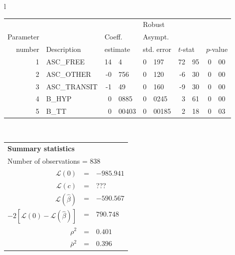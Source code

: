   \begin{tabular}{l}
\begin{tabular}{rlr@{.}lr@{.}lr@{.}lr@{.}l}
         &                       &   \multicolumn{2}{l}{}    & \multicolumn{2}{l}{Robust}  &     \multicolumn{4}{l}{}   \\
Parameter &                       &   \multicolumn{2}{l}{Coeff.}      & \multicolumn{2}{l}{Asympt.}  &     \multicolumn{4}{l}{}   \\
number &  Description                     &   \multicolumn{2}{l}{estimate}      & \multicolumn{2}{l}{std. error}  &   \multicolumn{2}{l}{$t$-stat}  &   \multicolumn{2}{l}{$p$-value}   \\

\hline

1 & ASC\_FREE & 14&4 & 0&197 & 72&95 & 0&00 \\
2 & ASC\_OTHER & -0&756 & 0&120 & -6&30 & 0&00 \\
3 & ASC\_TRANSIT & -1&49 & 0&160 & -9&30 & 0&00 \\
4 & B\_HYP & 0&0885 & 0&0245 & 3&61 & 0&00 \\
5 & B\_TT & 0&00403 & 0&00185 & 2&18 & 0&03 \\
\hline

\end{tabular}
\\
\begin{tabular}{rcl}
\multicolumn{3}{l}{\bf Summary statistics}\\
\multicolumn{3}{l}{ Number of observations = $838$} \\
 $\mathcal{L}(0)$ &=&  $-985.941$ \\
 $\mathcal{L}(c)$ &=& ???\\
 $\mathcal{L}(\hat{\beta})$ &=& $-590.567 $  \\
 $-2[\mathcal{L}(0) -\mathcal{L}(\hat{\beta})]$ &=& $790.748$ \\
    $\rho^2$ &=&   $0.401$ \\
    $\bar{\rho}^2$ &=&    $0.396$ \\
\end{tabular}
\end{tabular}

